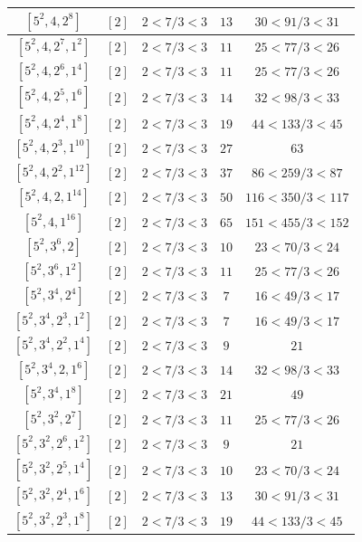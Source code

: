 \documentclass{article}%
\begin{document}
\begin{center}
\begin{longtable}{||c|c|c|c|c||}
$[5^{2}, 4, 2^{8}]$ & $[2]$ & $2 < 7/3 < 3$ & $13$ & $30 < 91/3 < 31$ \\ \hline 
$[5^{2}, 4, 2^{7}, 1^{2}]$ & $[2]$ & $2 < 7/3 < 3$ & $11$ & $25 < 77/3 < 26$ \\ \hline 
$[5^{2}, 4, 2^{6}, 1^{4}]$ & $[2]$ & $2 < 7/3 < 3$ & $11$ & $25 < 77/3 < 26$ \\ \hline 
$[5^{2}, 4, 2^{5}, 1^{6}]$ & $[2]$ & $2 < 7/3 < 3$ & $14$ & $32 < 98/3 < 33$ \\ \hline 
$[5^{2}, 4, 2^{4}, 1^{8}]$ & $[2]$ & $2 < 7/3 < 3$ & $19$ & $44 < 133/3 < 45$ \\ \hline 
$[5^{2}, 4, 2^{3}, 1^{10}]$ & $[2]$ & $2 < 7/3 < 3$ & $27$ & $63$ \\ \hline 
$[5^{2}, 4, 2^{2}, 1^{12}]$ & $[2]$ & $2 < 7/3 < 3$ & $37$ & $86 < 259/3 < 87$ \\ \hline 
$[5^{2}, 4, 2, 1^{14}]$ & $[2]$ & $2 < 7/3 < 3$ & $50$ & $116 < 350/3 < 117$ \\ \hline 
$[5^{2}, 4, 1^{16}]$ & $[2]$ & $2 < 7/3 < 3$ & $65$ & $151 < 455/3 < 152$ \\ \hline 
$[5^{2}, 3^{6}, 2]$ & $[2]$ & $2 < 7/3 < 3$ & $10$ & $23 < 70/3 < 24$ \\ \hline 
$[5^{2}, 3^{6}, 1^{2}]$ & $[2]$ & $2 < 7/3 < 3$ & $11$ & $25 < 77/3 < 26$ \\ \hline 
$[5^{2}, 3^{4}, 2^{4}]$ & $[2]$ & $2 < 7/3 < 3$ & $7$ & $16 < 49/3 < 17$ \\ \hline 
$[5^{2}, 3^{4}, 2^{3}, 1^{2}]$ & $[2]$ & $2 < 7/3 < 3$ & $7$ & $16 < 49/3 < 17$ \\ \hline 
$[5^{2}, 3^{4}, 2^{2}, 1^{4}]$ & $[2]$ & $2 < 7/3 < 3$ & $9$ & $21$ \\ \hline 
$[5^{2}, 3^{4}, 2, 1^{6}]$ & $[2]$ & $2 < 7/3 < 3$ & $14$ & $32 < 98/3 < 33$ \\ \hline 
$[5^{2}, 3^{4}, 1^{8}]$ & $[2]$ & $2 < 7/3 < 3$ & $21$ & $49$ \\ \hline 
$[5^{2}, 3^{2}, 2^{7}]$ & $[2]$ & $2 < 7/3 < 3$ & $11$ & $25 < 77/3 < 26$ \\ \hline 
$[5^{2}, 3^{2}, 2^{6}, 1^{2}]$ & $[2]$ & $2 < 7/3 < 3$ & $9$ & $21$ \\ \hline 
$[5^{2}, 3^{2}, 2^{5}, 1^{4}]$ & $[2]$ & $2 < 7/3 < 3$ & $10$ & $23 < 70/3 < 24$ \\ \hline 
$[5^{2}, 3^{2}, 2^{4}, 1^{6}]$ & $[2]$ & $2 < 7/3 < 3$ & $13$ & $30 < 91/3 < 31$ \\ \hline 
$[5^{2}, 3^{2}, 2^{3}, 1^{8}]$ & $[2]$ & $2 < 7/3 < 3$ & $19$ & $44 < 133/3 < 45$ \\ \hline 

\end{longtable}
\end{center}
\end{document}
